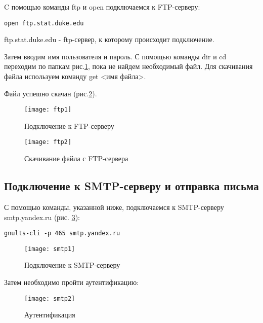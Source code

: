 C помощью команды ftp и open подключаемся к FTP-серверу:

\begin{lstlisting}
open ftp.stat.duke.edu
\end{lstlisting}

ftp.stat.duke.edu - ftp-сервер, к которому происходит подключение.

Затем вводим имя пользователя и пароль. С помощью команды dir и cd переходим по папкам рис.\ref{pic:ftp1}, пока не найдем необходимый файл. Для скачивания файла используем команду get <имя файла>.

Файл успешно скачан (рис.\ref{pic:ftp2}).

\begin{figure}[H]
	\begin{center}
		\texttt{[image: ftp1]}
		\caption{Подключение к FTP-серверу} 
		\label{pic:ftp1} %
	\end{center}
\end{figure}

\begin{figure}[H]
	\begin{center}
		\texttt{[image: ftp2]}
		\caption{Скачивание файла с FTP-сервера} 
		\label{pic:ftp2} %
	\end{center}
\end{figure}

\subsection{Подключение к SMTP-серверу и отправка письма}

С помощью команды, указанной ниже, подключаемся к SMTP-серверу smtp.yandex.ru (рис. \ref{pic:smtp1}):

\begin{lstlisting}
gnults-cli -p 465 smtp.yandex.ru
\end{lstlisting}

\begin{figure}[H]
	\begin{center}
		\texttt{[image: smtp1]}
		\caption{Подключение к SMTP-серверу} 
		\label{pic:smtp1} %
	\end{center}
\end{figure}

Затем необходимо пройти аутентификацию:

\begin{figure}[H]
	\begin{center}
		\texttt{[image: smtp2]}
		\caption{Аутентификация} 
		\label{pic:smtp2} %
	\end{center}
\end{figure}

